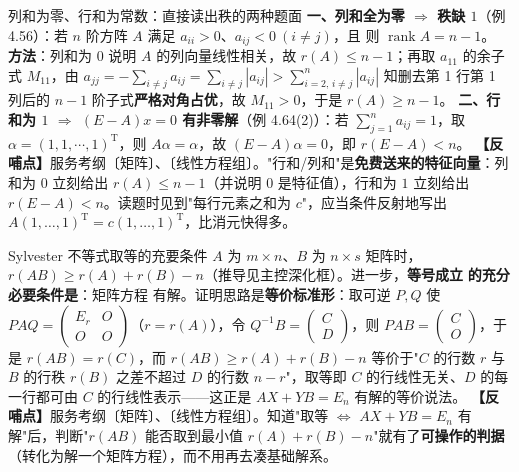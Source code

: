 \begin{fdeep}{列和为零、行和为常数：直接读出秩的两种题面}
\textbf{一、列和全为零 $\Rightarrow$ 秩缺 $1$}（例 4.56）：若 $n$ 阶方阵 $A$ 满足 $a_{ii}>0$、$a_{ij}<0\ (i\ne j)$，且
则 $\operatorname{rank}A=n-1$。
\textbf{方法}：列和为 $0$ 说明 $A$ 的列向量线性相关，故 $r(A)\le n-1$；再取 $a_{11}$ 的余子式 $M_{11}$，由
$a_{jj}=-\sum_{i\ne j}a_{ij}=\sum_{i\ne j}|a_{ij}|>\sum_{i=2,\,i\ne j}^{n}|a_{ij}|$
知删去第 1 行第 1 列后的 $n-1$ 阶子式\textbf{严格对角占优}，故 $M_{11}>0$，于是 $r(A)\ge n-1$。
\textbf{二、行和为 $1$ $\Rightarrow$ $(E-A)x=0$ 有非零解}（例 4.64(2)）：若 $\sum_{j=1}^{n}a_{ij}=1$，取 $\alpha=(1,1,\cdots,1)^{\mathrm T}$，则 $A\alpha=\alpha$，故 $(E-A)\alpha=0$，即 $r(E-A)<n$。
\textbf{【反哺点】}服务考纲〔矩阵〕、〔线性方程组〕。"行和/列和"是\textbf{免费送来的特征向量}：列和为 $0$ 立刻给出 $r(A)\le n-1$（并说明 $0$ 是特征值），行和为 $1$ 立刻给出 $r(E-A)<n$。读题时见到"每行元素之和为 $c$"，应当条件反射地写出 $A(1,\dots,1)^{\mathrm T}=c(1,\dots,1)^{\mathrm T}$，比消元快得多。
\end{fdeep}


\begin{fdeep}{Sylvester 不等式取等的充要条件}
$A$ 为 $m\times n$、$B$ 为 $n\times s$ 矩阵时，$r(AB)\ge r(A)+r(B)-n$（推导见主控深化框）。进一步，\textbf{等号成立}
\textbf{的充分必要条件是}：矩阵方程
有解。证明思路是\textbf{等价标准形}：取可逆 $P,Q$ 使 $PAQ=\begin{pmatrix}E_r&O\\ O&O\end{pmatrix}$（$r=r(A)$），令 $Q^{-1}B=\begin{pmatrix}C\\ D\end{pmatrix}$，则 $PAB=\begin{pmatrix}C\\ O\end{pmatrix}$，于是 $r(AB)=r(C)$，而 $r(AB)\ge r(A)+r(B)-n$ 等价于"$C$ 的行数 $r$ 与 $B$ 的行秩 $r(B)$ 之差不超过 $D$ 的行数 $n-r$"，取等即 $C$ 的行线性无关、$D$ 的每一行都可由 $C$ 的行线性表示——这正是 $AX+YB=E_n$ 有解的等价说法。
\textbf{【反哺点】}服务考纲〔矩阵〕、〔线性方程组〕。知道"取等 $\iff$ $AX+YB=E_n$ 有解"后，判断"$r(AB)$ 能否取到最小值 $r(A)+r(B)-n$"就有了\textbf{可操作的判据}（转化为解一个矩阵方程），而不用再去凑基础解系。
\end{fdeep}


